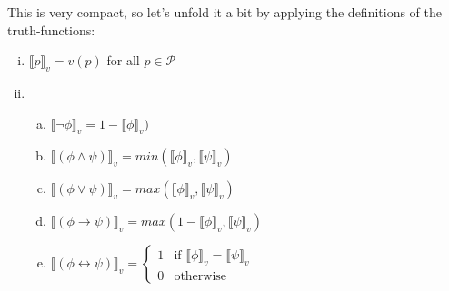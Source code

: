 \begin{enumerate}[\thesection.1]
		This is very compact, so let's unfold it a bit by applying the definitions of the truth-functions:
		\begin{enumerate}[(i)]
		
			\item  $\llbracket p\rrbracket_v=v(p)$ for all $p\in\mathcal{P}$
			
			\item \begin{enumerate}[(a)]
			
				\item  $\llbracket\neg \phi\rrbracket_v=1-\llbracket\phi\rrbracket_v)$
				
				\item  $\llbracket(\phi\land \psi)\rrbracket_v=min(\llbracket\phi\rrbracket_v, \llbracket\psi\rrbracket_v)$
				\item[] $\llbracket(\phi\lor \psi)\rrbracket_v=max(\llbracket\phi\rrbracket_v, \llbracket\psi\rrbracket_v)$		
				\item[] $\llbracket(\phi\to \psi)\rrbracket_v=max(1-\llbracket\phi\rrbracket_v, \llbracket\psi\rrbracket_v)$		
				
				\item[] $\llbracket(\phi\leftrightarrow \psi)\rrbracket_v=\begin{cases} 1 & \text{if } \llbracket\phi\rrbracket_v=\llbracket\psi\rrbracket_v\\0&\text{otherwise}\end{cases}$		
	

\end{enumerate}
\end{enumerate}
\end{enumerate}

